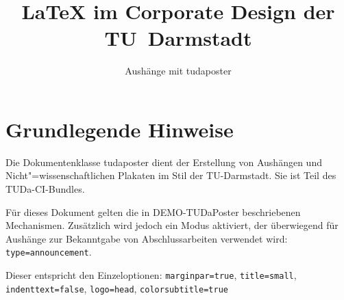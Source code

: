 \documentclass[
	paper=a4,
	ngerman,
	color=black!20,
	footer=true,
	type=announcement,
	]{tudaposter}
\let\code\texttt
\begin{document}
\title{\LaTeX{} im Corporate Design der TU~Darmstadt}
\subtitle{Aushänge mit tudaposter}



\maketitle

\section*{Grundlegende Hinweise}

Die Dokumentenklasse tudaposter dient der Erstellung von Aushängen und Nicht"=wissenschaftlichen Plakaten im Stil der TU-Darmstadt. Sie ist Teil des TUDa-CI-Bundles.

Für dieses Dokument gelten die in DEMO-TUDaPoster beschriebenen Mechanismen. Zusätzlich wird jedoch ein Modus aktiviert, der überwiegend für Aushänge zur Bekanntgabe von Abschlussarbeiten verwendet wird: \code{type=announcement}.

Dieser entspricht den Einzeloptionen: \code{marginpar=true}, \code{title=small}, \code{indenttext=false}, \code{logo=head}, \code{colorsubtitle=true}
\end{document}
